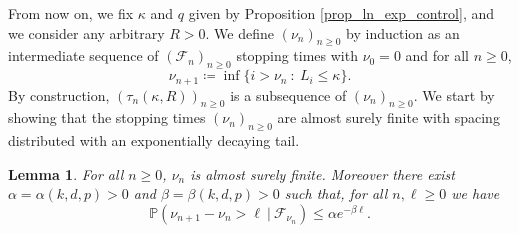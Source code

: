 \documentclass[a4paper, 11pt]{article}
\theoremstyle{plain}
\newtheorem{Lemma}[Theorem]{Lemma}
\theoremstyle{definition}
\renewcommand{\P}{\mathbb{P}}
\numberwithin{equation}{section}
\begin{document}
From now on, we fix $\kappa$ and $q$ given by Proposition \ref{prop_ln_exp_control}, and we consider any arbitrary $R>0$. We define $(\nu_n)_{n\geq 0}$ by induction as an intermediate sequence of $(\mathcal F_n)_{n\geq0}$ stopping times with $\nu_0=0$ and for all $n\geq 0$,
    \[\nu_{n+1}\coloneqq\inf\{i>\nu_n~:~L_i\leq\kappa\}.\]
By construction, $(\tau_n(\kappa, R))_{n\geq0}$ is a subsequence of $(\nu_n)_{n\geq0}$. We start by showing that the stopping times $(\nu_n)_{n\geq0}$ are almost surely finite with spacing distributed with an exponentially decaying tail.


\begin{Lemma}
    \label{lemma_tau_n_tail}
    For all $n\geq 0$, $\nu_n$ is almost surely finite. Moreover there exist $\alpha=\alpha(k, d, p)>0$ and $\beta=\beta(k, d, p)>0$ such that, for all $n,\ell\geq 0$ we have
        \[\P\left(\nu_{n+1}-\nu_n>\ell~\vert~\mathcal F_{\nu_n}\right)\leq \alpha e^{-\beta \ell}.\]
\end{Lemma}
\end{document}
